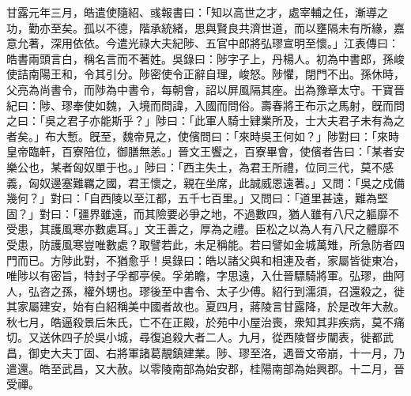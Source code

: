\begin{pinyinscope}
甘露元年三月，皓遣使隨紹、彧報書曰：「知以高世之才，處宰輔之任，漸導之功，勤亦至矣。孤以不德，階承統緒，思與賢良共濟世道，而以壅隔未有所緣，嘉意允著，深用依依。今遣光祿大夫紀陟、五官中郎將弘璆宣明至懷。」江表傳曰：皓書兩頭言白，稱名言而不著姓。吳錄曰：陟字子上，丹楊人。初為中書郎，孫峻使詰南陽王和，令其引分。陟密使令正辭自理，峻怒。陟懼，閉門不出。孫休時，父亮為尚書令，而陟為中書令，每朝會，詔以屏風隔其座。出為豫章太守。干寶晉紀曰：陟、璆奉使如魏，入境而問諱，入國而問俗。壽春將王布示之馬射，旣而問之曰：「吳之君子亦能斯乎？」陟曰：「此軍人騎士肄業所及，士大夫君子未有為之者矣。」布大慙。旣至，魏帝見之，使儐問曰：「來時吳王何如？」陟對曰：「來時皇帝臨軒，百寮陪位，御膳無恙。」晉文王饗之，百寮畢會，使儐者告曰：「某者安樂公也，某者匈奴單于也。」陟曰：「西主失土，為君王所禮，位同三代，莫不感義，匈奴邊塞難羈之國，君王懷之，親在坐席，此誠威恩遠著。」又問：「吳之戍備幾何？」對曰：「自西陵以至江都，五千七百里。」又問曰：「道里甚遠，難為堅固？」對曰：「疆界雖遠，而其險要必爭之地，不過數四，猶人雖有八尺之軀靡不受患，其護風寒亦數處耳。」文王善之，厚為之禮。臣松之以為人有八尺之體靡不受患，防護風寒豈唯數處？取譬若此，未足稱能。若曰譬如金城萬雉，所急防者四門而已。方陟此對，不猶愈乎！吳錄曰：皓以諸父與和相連及者，家屬皆徙東冶，唯陟以有密旨，特封子孚都亭侯。孚弟瞻，字思遠，入仕晉驃騎將軍。弘璆，曲阿人，弘咨之孫，權外甥也。璆後至中書令、太子少傅。紹行到濡須，召還殺之，徙其家屬建安，始有白紹稱美中國者故也。夏四月，蔣陵言甘露降，於是改年大赦。秋七月，皓逼殺景后朱氏，亡不在正殿，於苑中小屋治喪，衆知其非疾病，莫不痛切。又送休四子於吳小城，尋復追殺大者二人。九月，從西陵督步闡表，徙都武昌，御史大夫丁固、右將軍諸葛靚鎮建業。陟、璆至洛，遇晉文帝崩，十一月，乃遣還。皓至武昌，又大赦。以零陵南部為始安郡，桂陽南部為始興郡。十二月，晉受禪。


\end{pinyinscope}
